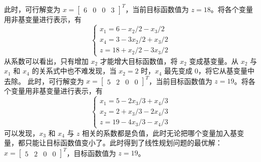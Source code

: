 此时，可行解变为 $x = \begin{bmatrix}6 & 0 & 0 & 3\end{bmatrix}^T$，当前目标函数值为 $z = 18$。将各个变量用非基变量进行表示，有
$$
\begin{cases}
x_1 = 6 - x_2/2 - x_3/2 \\ 
x_4 = 3 - 3x_2/2 + x_3/2 \\ 
z = 18 + x_2/2 - 3x_3/2
\end{cases}
$$
从系数可以看出，只有增加 $x_2$ 才能增大目标函数值，将 $x_2$ 变成基变量。从 $x_2$ 与 $x_1$ 和 $x_4$ 的关系式中也不难发现，当 $x_2 = 2$ 时，$x_4$ 最先变成 0，将它从基变量中去除。
此时，可行解变为 $x = \begin{bmatrix} 5 & 2 & 0 & 0 \end{bmatrix}^T$，当前目标函数值为 $z = 19$。将各个变量用非基变量进行表示，有 
$$
\begin{cases}
x_1 = 5 - 2x_3/3 + x_4/3 \\ 
x_2 = 2 + x_3/3 - 2x_4/3 \\ 
z = 19 - 4x_3/3 - x_4/3
\end{cases}
$$
可以发现，$x_3$ 和 $x_4$ 与 $z$ 相关的系数都是负值，此时无论把哪个变量加入基变量，都只能让目标函数值变小了。此时得到了线性规划问题的最优解：$x = \begin{bmatrix} 5 & 2 & 0 & 0 \end{bmatrix}^T$，目标函数值为 $z = 19$。

